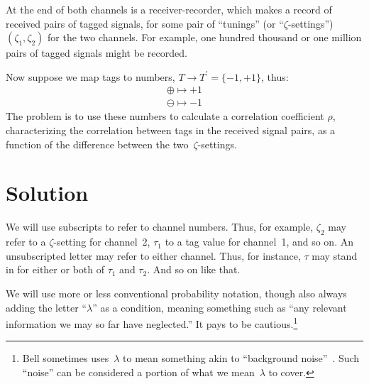 \documentclass[9pt,technote]{IEEEtran}
\begin{document}
At the end of both channels is a receiver-recorder, which makes a
record of received pairs of tagged signals, for some pair of
``tunings'' (or ``$\zeta$-settings'') $(\zeta_1,\zeta_2)$ for the two
channels. For example, one hundred thousand or one million pairs of
tagged signals might be recorded.

Now suppose we map tags to numbers, $T\to T^{\prime}=\{-1,+1\}$, thus:
\begin{align}
  \oplus \mapsto +1 \\
  \ominus \mapsto -1
\end{align}
The problem is to use these numbers to calculate a correlation
coefficient $\rho$, characterizing the correlation between tags in the
received signal pairs, as a function of the difference between the
two~$\zeta$-settings.

\section{Solution}

We will use subscripts to refer to channel numbers. Thus, for example,
$\zeta_2$ may refer to a $\zeta$-setting for channel~2, $\tau_1$ to a
tag value for channel~1, and so on. An unsubscripted letter may refer
to either channel. Thus, for instance, $\tau$ may stand in for either
or both of $\tau_1$ and $\tau_2$. And so on like that.

We will use more or less conventional probability notation, though
also always adding the letter ``$\lambda$'' as a condition, meaning
something such as ``any relevant information we may so far have
neglected.'' It pays to be cautious.\footnote{Bell sometimes
  uses~$\lambda$ to mean something akin to ``background
  noise''~\cite{bertlmann:manuscript}.  Such ``noise'' can be
  considered a portion of what we mean~$\lambda$ to cover.}
\end{document}

